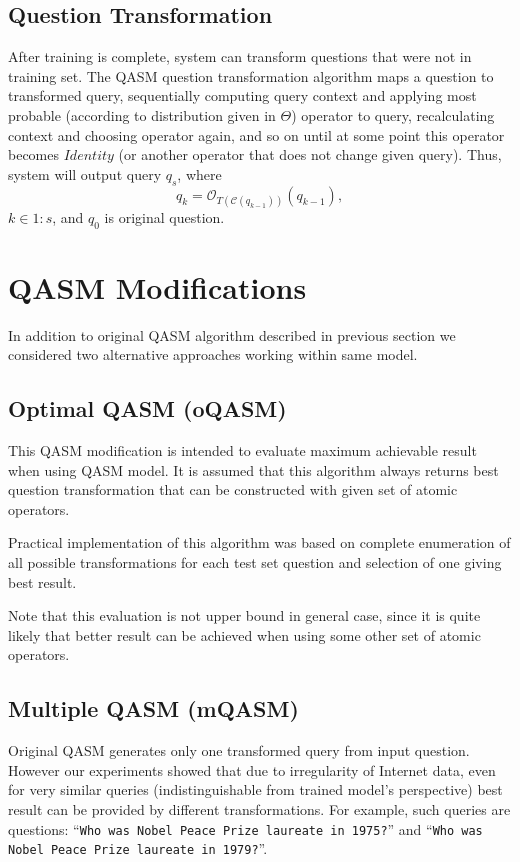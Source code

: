 \documentclass{article}
\newcommand{\query}[1]{``{\textrm{\tt #1}}''}
\begin{document}
\subsection{Question Transformation}
After training is complete, system can transform questions that were not
in training set.
The QASM question transformation algorithm \cite{qa:radev:qasm}
maps a question to transformed query,
sequentially computing query context and applying most probable
(according to distribution given in $\Theta$)
operator to query,
recalculating context and choosing operator again, and so on
until at some point this operator becomes $Identity$
(or another operator that does not change given query).
Thus, system will output query $q_s$, where
$$q_k=\mathcal{O}_{T(\mathcal{C}(q_{k-1}))}(q_{k-1}),$$
$k\in 1:s$, and $q_0$ is original question.

\section{QASM Modifications}

In addition to original QASM algorithm described in previous section
we considered two alternative approaches working within
same model.

\subsection{Optimal QASM (oQASM)}

This QASM modification is intended to evaluate maximum achievable
result when using QASM model. It is assumed
that this algorithm always returns best question transformation
that can be constructed with given set of atomic
operators.

Practical implementation of this algorithm was based on
complete enumeration of all possible transformations
for each test set question and
selection of one giving best result.

Note that this evaluation is not upper bound in general case,
since it is quite likely that better result can be achieved
when using some other set of atomic operators.

\subsection{Multiple QASM (mQASM)}\label{mqasm}

Original QASM generates only one transformed query from input question.
However our experiments showed
that due to irregularity of Internet data, even for very similar queries
(indistinguishable from trained model's perspective) best result
can be provided by different transformations.
For example, such queries
are questions:
\query{Who was Nobel Peace Prize laureate in 1975?} and
\query{Who was Nobel Peace Prize laureate in 1979?}.
\end{document}
